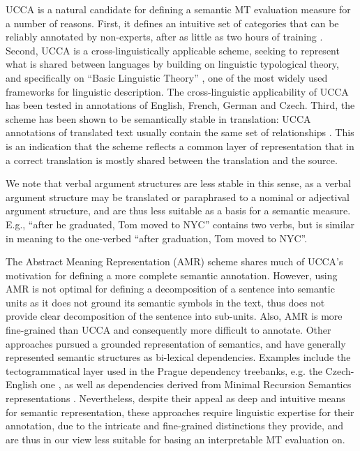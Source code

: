 \documentclass[11pt]{article}
\newcommand{\oa}[1]{}
\def\parcite#1{\cite{#1}}
\begin{document}
UCCA is a natural candidate for defining a semantic
MT evaluation measure for a number of reasons. 
First, it defines an intuitive set of categories
that can be reliably annotated by non-experts, after as little as two hours
of training \cite{marinotti2014}.
Second, UCCA is a cross-linguistically applicable scheme, seeking to
represent what is shared between languages
by building on linguistic typological theory, and specifically on ``Basic Linguistic Theory''
\cite{Dixon:10a,Dixon:10b,Dixon:12}, one of the most widely used frameworks for linguistic description.
The cross-linguistic applicability of UCCA has been tested in annotations of
English, French, German and Czech.
Third, the scheme has been shown to be semantically stable
in translation: UCCA annotations of translated text usually contain the same set of relationships
\cite{sulem2015conceptual}. This is an indication that the scheme reflects
a common layer of representation that in a correct translation
is mostly shared between the translation and the source. 

We note that verbal argument structures are less stable in this sense, as a verbal
argument structure may be translated or paraphrased to a nominal or adjectival
argument structure, and are thus less suitable as a basis for a semantic measure.
E.g., ``after he graduated, Tom moved to NYC'' contains two verbs,
but is similar in meaning to the one-verbed
``after graduation, Tom moved to NYC''. 


The Abstract Meaning Representation (AMR) scheme \cite{banarescu2013abstract}
shares much of UCCA's motivation for defining a more complete semantic annotation.
However, using AMR is not optimal for defining a decomposition of a sentence into semantic
units as it does not ground its semantic symbols in the text,
thus does not provide clear decomposition of the sentence into sub-units.
Also, AMR is more fine-grained than UCCA and consequently more difficult to annotate.
Other approaches pursued a grounded representation of semantics,
and have generally represented semantic structures as bi-lexical dependencies.
Examples include the tectogrammatical layer \parcite{sgallhp:1986} used in the Prague dependency
treebanks, e.g. the Czech-English one \parcite{hajic2012announcing}, as well
as dependencies derived from Minimal Recursion Semantics representations \parcite{oepen2006discriminant}.
Nevertheless, despite their appeal as deep and intuitive means for semantic representation,
these approaches require linguistic expertise for their annotation, due to the intricate and
fine-grained distinctions they provide, and are thus in our view less suitable for basing
an interpretable MT evaluation on. 
\end{document}
